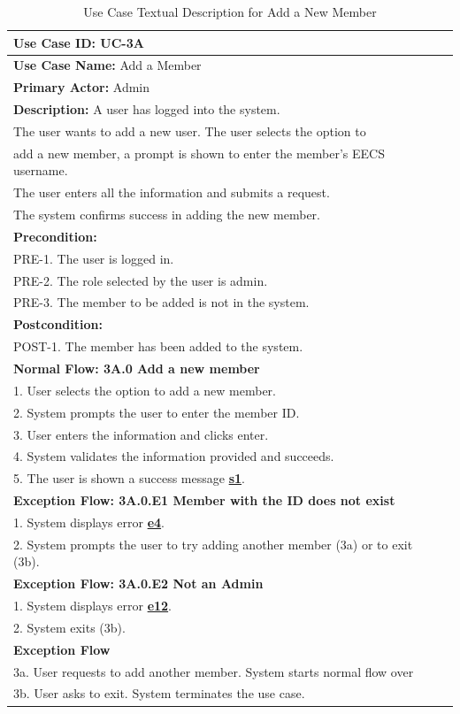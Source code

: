 \documentclass[fontsize=12pt,paper=letter,twoside]{scrartcl}
\begin{document}
\begin{table}[!htb]
\begin{center}
\begin{tabular}{|l|l|}
\hline
\textbf{Use Case ID:} UC-3A \\ \hline
\textbf{Use Case Name:} Add a Member \\ \hline
\textbf {Primary Actor:} Admin \\ \hline
\textbf{Description:} A user has logged into the system. \\The user wants to add a new user. The user selects the option to \\add a new member, a prompt is shown to enter the member's EECS username. \\ The user enters all the information and submits a request. \\ The system confirms success in adding the new member.\\ \hline
\textbf{Precondition:}
\\ PRE-1. The user is logged in.
\\ PRE-2. The role selected by the user is admin.
\\ PRE-3. The member to be added is not in the system. \\ \hline
\textbf{Postcondition:}
\\ POST-1. The member has been added to the system. \\ \hline
\textbf{Normal Flow: 3A.0 Add a new member}
\\ 1. User selects the option to add a new member.
\\ 2. System prompts the user to enter the member ID.
\\ 3. User enters the information and clicks enter.
\\ 4. System validates the information provided and succeeds.
\\ 5. The user is shown a success message \hyperref[app:success]{\textbf{s1}}.\\ \hline
\textbf{Exception Flow: 3A.0.E1 Member with the ID does not exist}
\\ 1. System displays error \hyperref[app:error]{\textbf{e4}}.
\\ 2. System prompts the user to try adding another member (3a) or to exit (3b). \\ \hline
\textbf{Exception Flow: 3A.0.E2 Not an Admin}
\\ 1. System displays error  \hyperref[app:error]{\textbf{e12}}.
\\ 2. System exits (3b). \\ \hline 
\textbf{Exception Flow}
\\ 3a. User requests to add another member. System starts normal flow over
\\ 3b. User asks to exit. System terminates the use case.\\ \hline

\end{tabular}
\end{center}
\caption {Use Case Textual Description for Add a New Member}
\label{tbl:uc3Atd}
\end{table}
\end{document}
